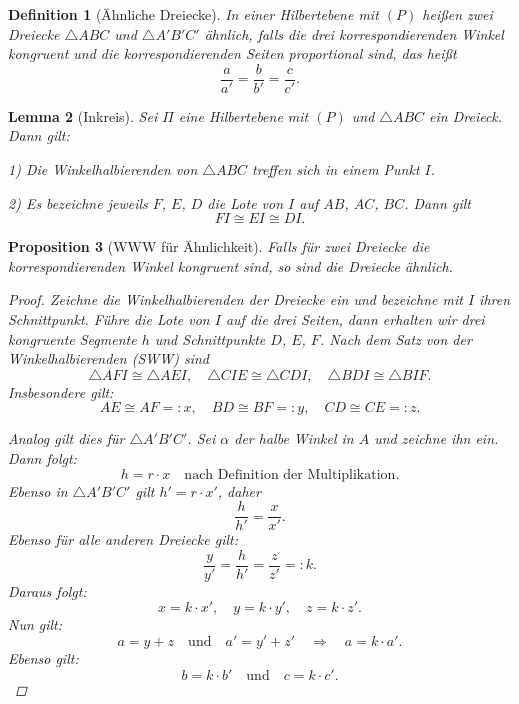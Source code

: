 \documentclass[a4paper,12pt]{article}
\theoremstyle{break}
\newtheorem{definition}{Definition}[section]
\newtheorem{proposition}[definition]{Proposition}
\newtheorem{lemma}[definition]{Lemma}
\begin{document}
\begin{definition}[Ähnliche Dreiecke]
In einer Hilbertebene mit \((P)\) heißen zwei Dreiecke \(\triangle ABC\) und \(\triangle A'B'C'\) ähnlich, falls die drei korrespondierenden Winkel kongruent und die korrespondierenden Seiten proportional sind, das heißt
\[
\frac{a}{a'} = \frac{b}{b'} = \frac{c}{c'}.
\]
\end{definition}

\begin{lemma}[Inkreis]
Sei \(\Pi\) eine Hilbertebene mit \((P)\) und \(\triangle ABC\) ein Dreieck. Dann gilt:

1) Die Winkelhalbierenden von \(\triangle ABC\) treffen sich in einem Punkt \(I\).

2) Es bezeichne jeweils \(F\), \(E\), \(D\) die Lote von \(I\) auf \(AB\), \(AC\), \(BC\). Dann gilt
\[
FI \cong EI \cong DI.
\]
\end{lemma}

\begin{proposition}[WWW für Ähnlichkeit]\label{prop:www_ähnlich}
Falls für zwei Dreiecke die korrespondierenden Winkel kongruent sind, so sind die Dreiecke ähnlich.
\begin{proof}
Zeichne die Winkelhalbierenden der Dreiecke ein und bezeichne mit \(I\) ihren Schnittpunkt. Führe die Lote von \(I\) auf die drei Seiten, dann erhalten wir drei kongruente Segmente \(h\) und Schnittpunkte \(D\), \(E\), \(F\). Nach dem Satz von der Winkelhalbierenden (SWW) sind
\[
\triangle AFI \cong \triangle AEI, \quad \triangle CIE \cong \triangle CDI, \quad \triangle BDI \cong \triangle BIF.
\]
Insbesondere gilt:
\[
AE \cong AF =: x, \quad BD \cong BF =: y, \quad CD \cong CE =: z.
\]

Analog gilt dies für \(\triangle A'B'C'\). Sei \(\alpha\) der halbe Winkel in \(A\) und zeichne ihn ein. Dann folgt:
\[
h = r \cdot x \quad \text{nach Definition der Multiplikation}.
\]
Ebenso in \(\triangle A'B'C'\) gilt \(h' = r \cdot x'\), daher
\[
\frac{h}{h'} = \frac{x}{x'}.
\]
Ebenso für alle anderen Dreiecke gilt:
\[
\frac{y}{y'} = \frac{h}{h'} = \frac{z}{z'} =: k.
\]
Daraus folgt:
\[
x = k \cdot x', \quad y = k \cdot y', \quad z = k \cdot z'.
\]
Nun gilt:
\[
a = y + z \quad \text{und} \quad a' = y' + z' \quad \Rightarrow \quad a = k \cdot a'.
\]
Ebenso gilt:
\[
b = k \cdot b' \quad \text{und} \quad c = k \cdot c'.
\]
\end{proof}
\end{proposition}
\end{document}

